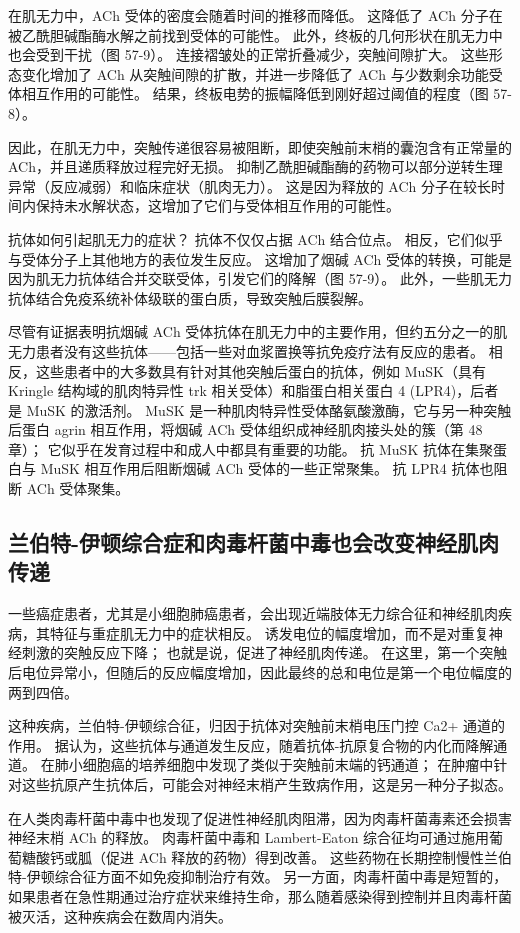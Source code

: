在肌无力中，ACh 受体的密度会随着时间的推移而降低。 这降低了 ACh 分子在被乙酰胆碱酯酶水解之前找到受体的可能性。 此外，终板的几何形状在肌无力中也会受到干扰（图 57-9）。 连接褶皱处的正常折叠减少，突触间隙扩大。 这些形态变化增加了 ACh 从突触间隙的扩散，并进一步降低了 ACh 与少数剩余功能受体相互作用的可能性。 结果，终板电势的振幅降低到刚好超过阈值的程度（图 57-8）。

因此，在肌无力中，突触传递很容易被阻断，即使突触前末梢的囊泡含有正常量的 ACh，并且递质释放过程完好无损。 抑制乙酰胆碱酯酶的药物可以部分逆转生理异常（反应减弱）和临床症状（肌肉无力）。 这是因为释放的 ACh 分子在较长时间内保持未水解状态，这增加了它们与受体相互作用的可能性。

抗体如何引起肌无力的症状？ 抗体不仅仅占据 ACh 结合位点。 相反，它们似乎与受体分子上其他地方的表位发生反应。 这增加了烟碱 ACh 受体的转换，可能是因为肌无力抗体结合并交联受体，引发它们的降解（图 57-9）。 此外，一些肌无力抗体结合免疫系统补体级联的蛋白质，导致突触后膜裂解。

尽管有证据表明抗烟碱 ACh 受体抗体在肌无力中的主要作用，但约五分之一的肌无力患者没有这些抗体——包括一些对血浆置换等抗免疫疗法有反应的患者。 相反，这些患者中的大多数具有针对其他突触后蛋白的抗体，例如 MuSK（具有 Kringle 结构域的肌肉特异性 trk 相关受体）和脂蛋白相关蛋白 4 (LPR4)，后者是 MuSK 的激活剂。 MuSK 是一种肌肉特异性受体酪氨酸激酶，它与另一种突触后蛋白 agrin 相互作用，将烟碱 ACh 受体组织成神经肌肉接头处的簇（第 48 章）； 它似乎在发育过程中和成人中都具有重要的功能。 抗 MuSK 抗体在集聚蛋白与 MuSK 相互作用后阻断烟碱 ACh 受体的一些正常聚集。 抗 LPR4 抗体也阻断 ACh 受体聚集。

\subsection{兰伯特-伊顿综合症和肉毒杆菌中毒也会改变神经肌肉传递}

一些癌症患者，尤其是小细胞肺癌患者，会出现近端肢体无力综合征和神经肌肉疾病，其特征与重症肌无力中的症状相反。 诱发电位的幅度增加，而不是对重复神经刺激的突触反应下降； 也就是说，促进了神经肌肉传递。 在这里，第一个突触后电位异常小，但随后的反应幅度增加，因此最终的总和电位是第一个电位幅度的两到四倍。

这种疾病，兰伯特-伊顿综合征，归因于抗体对突触前末梢电压门控 Ca2+ 通道的作用。 据认为，这些抗体与通道发生反应，随着抗体-抗原复合物的内化而降解通道。 在肺小细胞癌的培养细胞中发现了类似于突触前末端的钙通道； 在肿瘤中针对这些抗原产生抗体后，可能会对神经末梢产生致病作用，这是另一种分子拟态。

在人类肉毒杆菌中毒中也发现了促进性神经肌肉阻滞，因为肉毒杆菌毒素还会损害神经末梢 ACh 的释放。 肉毒杆菌中毒和 Lambert-Eaton 综合征均可通过施用葡萄糖酸钙或胍（促进 ACh 释放的药物）得到改善。 这些药物在长期控制慢性兰伯特-伊顿综合征方面不如免疫抑制治疗有效。 另一方面，肉毒杆菌中毒是短暂的，如果患者在急性期通过治疗症状来维持生命，那么随着感染得到控制并且肉毒杆菌被灭活，这种疾病会在数周内消失。

